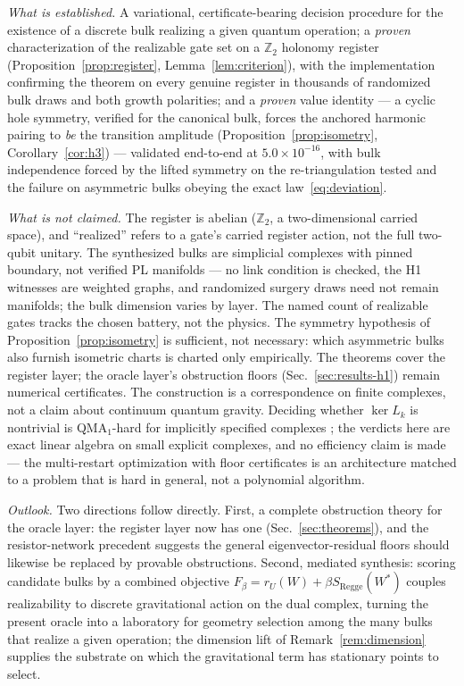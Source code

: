 \documentclass[a4paper,twocolumn,11pt,unpublished]{quantumarticle}
\theoremstyle{plain}
\theoremstyle{remark}
\newcommand{\kerL}{\ker L}
\begin{document}
\emph{What is established.} A variational, certificate-bearing decision
procedure for the existence of a discrete bulk realizing a given quantum
operation; a \emph{proven} characterization of the realizable gate set on
a $\mathbb{Z}_2$ holonomy register (Proposition~\ref{prop:register},
Lemma~\ref{lem:criterion}), with the implementation confirming the
theorem on every genuine register in thousands of randomized bulk draws
and both growth polarities; and a \emph{proven} value identity --- a
cyclic hole symmetry, verified for the canonical bulk, forces the
anchored harmonic pairing to \emph{be} the transition amplitude
(Proposition~\ref{prop:isometry}, Corollary~\ref{cor:h3}) --- validated
end-to-end at $5.0\times10^{-16}$, with bulk independence forced by the
lifted symmetry on the re-triangulation tested and the failure on
asymmetric bulks obeying the exact law~\eqref{eq:deviation}.

\emph{What is not claimed.} The register is abelian ($\mathbb{Z}_2$, a
two-dimensional carried space), and ``realized'' refers to a gate's
carried register action, not the full two-qubit unitary. The synthesized
bulks are simplicial complexes with pinned boundary, not verified PL
manifolds --- no link condition is checked, the H1 witnesses are weighted
graphs, and randomized surgery draws need not remain manifolds; the bulk
dimension varies by layer. The named count of realizable gates tracks the
chosen battery, not the physics. The symmetry hypothesis of
Proposition~\ref{prop:isometry} is sufficient, not necessary: which
asymmetric bulks also furnish isometric charts is charted only
empirically. The theorems cover the register layer; the oracle layer's
obstruction floors (Sec.~\ref{sec:results-h1}) remain numerical
certificates. The construction is a correspondence on finite complexes,
not a claim about continuum quantum gravity. Deciding whether $\kerL_k$
is nontrivial is QMA$_1$-hard for implicitly specified complexes
\cite{CrichignoKohler2024Clique}; the verdicts here are exact linear
algebra on small explicit complexes, and no efficiency claim is made ---
the multi-restart optimization with floor certificates is an architecture
matched to a problem that is hard in general, not a polynomial algorithm.

\emph{Outlook.} Two directions follow directly. First, a complete
obstruction theory for the oracle layer: the register layer now has one
(Sec.~\ref{sec:theorems}), and the resistor-network precedent
\cite{CurtisIngermanMorrow1998Circular} suggests the general
eigenvector-residual floors should likewise be replaced by provable
obstructions. Second, mediated synthesis: scoring candidate
bulks by a combined objective $F_\beta=r_U(W)+\beta S_{\mathrm{Regge}}(W^*)$
couples realizability to discrete gravitational action on the dual
complex, turning the present oracle into a laboratory for geometry
selection among the many bulks that realize a given operation; the
dimension lift of Remark~\ref{rem:dimension} supplies the substrate on
which the gravitational term has stationary points to select.
\end{document}
